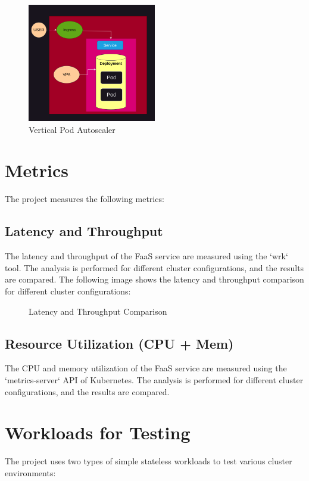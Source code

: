 \documentclass{article}
\begin{document}
\begin{figure}[H]
   \centering
   \includegraphics[width=0.5\textwidth]{../images/vpa.png}
   \caption{Vertical Pod Autoscaler}
\end{figure}

\section{Metrics}
The project measures the following metrics:

\subsection{Latency and Throughput}
The latency and throughput of the FaaS service are measured using the `wrk` tool. The analysis is performed for different cluster configurations, and the results are compared. The following image shows the latency and throughput comparison for different cluster configurations:

\begin{figure}[H]
   \centering
   \caption{Latency and Throughput Comparison}
\end{figure}

\subsection{Resource Utilization (CPU + Mem)}
The CPU and memory utilization of the FaaS service are measured using the `metrics-server` API of Kubernetes. The analysis is performed for different cluster configurations, and the results are compared.

\section{Workloads for Testing}
The project uses two types of simple stateless workloads to test various cluster environments:
\end{document}

